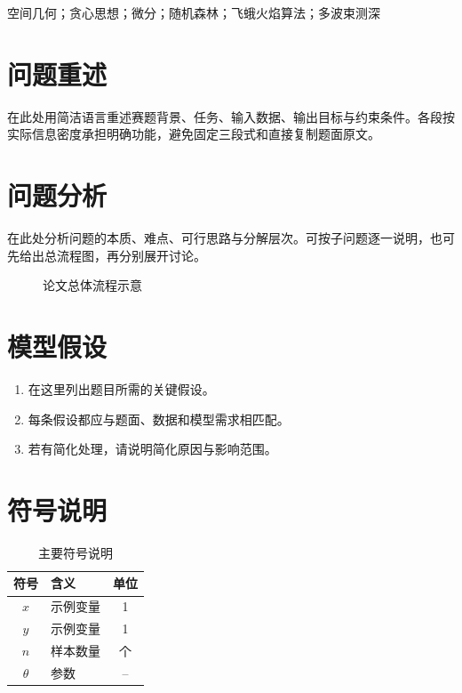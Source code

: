 \documentclass[12pt,a4paper]{article}
\newcommand{\keywordfont}{\fontsize{12pt}{16pt}\selectfont\heiti\bfseries}
\newcommand{\paperstrong}[1]{{\heiti #1}}
\begin{document}
\indent {\keywordfont \paperstrong{关键词：}} \paperstrong{空间几何}；\paperstrong{贪心思想}；\paperstrong{微分}；\paperstrong{随机森林}；\paperstrong{飞蛾火焰算法}；\paperstrong{多波束测深}\label{abstract:end}

\indent %

\newpage

\section{问题重述}

在此处用简洁语言重述赛题背景、任务、输入数据、输出目标与约束条件。各段按实际信息密度承担明确功能，避免固定三段式和直接复制题面原文。

\section{问题分析}

在此处分析问题的本质、难点、可行思路与分解层次。可按子问题逐一说明，也可先给出总流程图，再分别展开讨论。

\begin{figure}[H]
    \centering
    \caption{论文总体流程示意}
    \label{fig:flow}
\end{figure}

\section{模型假设}

\begin{enumerate}
    \item 在这里列出题目所需的关键假设。
    \item 每条假设都应与题面、数据和模型需求相匹配。
    \item 若有简化处理，请说明简化原因与影响范围。
\end{enumerate}

\section{符号说明}

\begin{table}[H]
    \centering
    \caption{主要符号说明}
    \begin{tabular}{clc}
        \toprule
        符号 & 含义 & 单位 \\
        \midrule
        $x$ & 示例变量 & 1 \\
        $y$ & 示例变量 & 1 \\
        $n$ & 样本数量 & 个 \\
        $\theta$ & 参数 & -- \\
        \bottomrule
    \end{tabular}
\end{table}
\end{document}

